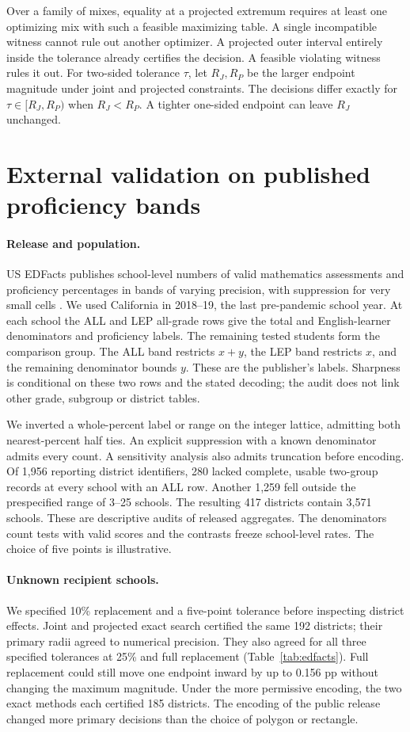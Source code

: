 \documentclass[11pt]{article}
\begin{document}
Over a family of mixes, equality at a projected extremum requires at least one optimizing mix with such a feasible maximizing table. A single incompatible witness cannot rule out another optimizer. A projected outer interval entirely inside the tolerance already certifies the decision. A feasible violating witness rules it out. For two-sided tolerance $\tau$, let $R_J,R_P$ be the larger endpoint magnitude under joint and projected constraints. The decisions differ exactly for $\tau\in[R_J,R_P)$ when $R_J<R_P$. A tighter one-sided endpoint can leave $R_J$ unchanged.

\section{External validation on published proficiency bands}
\paragraph{Release and population.}
US EDFacts publishes school-level numbers of valid mathematics assessments and proficiency percentages in bands of varying precision, with suppression for very small cells \cite{edfacts}. We used California in 2018--19, the last pre-pandemic school year. At each school the ALL and LEP all-grade rows give the total and English-learner denominators and proficiency labels. The remaining tested students form the comparison group. The ALL band restricts $x+y$, the LEP band restricts $x$, and the remaining denominator bounds $y$. These are the publisher's labels. Sharpness is conditional on these two rows and the stated decoding; the audit does not link other grade, subgroup or district tables.

We inverted a whole-percent label or range on the integer lattice, admitting both nearest-percent half ties. An explicit suppression with a known denominator admits every count. A sensitivity analysis also admits truncation before encoding. Of 1,956 reporting district identifiers, 280 lacked complete, usable two-group records at every school with an ALL row. Another 1,259 fell outside the prespecified range of 3--25 schools. The resulting 417 districts contain 3,571 schools. These are descriptive audits of released aggregates. The denominators count tests with valid scores and the contrasts freeze school-level rates. The choice of five points is illustrative.

\paragraph{Unknown recipient schools.}
We specified 10\% replacement and a five-point tolerance before inspecting district effects. Joint and projected exact search certified the same 192 districts; their primary radii agreed to numerical precision. They also agreed for all three specified tolerances at 25\% and full replacement (Table~\ref{tab:edfacts}). Full replacement could still move one endpoint inward by up to 0.156 pp without changing the maximum magnitude. Under the more permissive encoding, the two exact methods each certified 185 districts. The encoding of the public release changed more primary decisions than the choice of polygon or rectangle.
\end{document}
